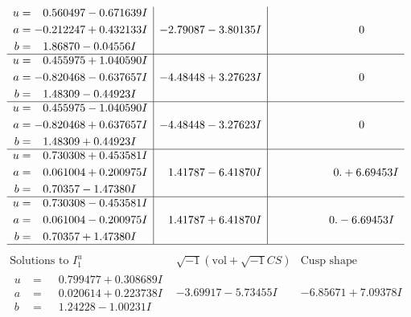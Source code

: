 \documentclass[1p]{elsarticle_modified}
\theoremstyle{definition}
\newcommand{\I}{\sqrt{-1}}
\begin{document}
$$\begin{array}{c|c|c}
\begin{aligned}
u &= \phantom{-}0.560497 - 0.671639 I \\
a &= -0.212247 + 0.432133 I \\
b &= \phantom{-}1.86870 - 0.04556 I\end{aligned}
 & -2.79087 - 3.80135 I & \phantom{-0.000000 } 0 \\ \hline\begin{aligned}
u &= \phantom{-}0.455975 + 1.040590 I \\
a &= -0.820468 - 0.637657 I \\
b &= \phantom{-}1.48309 - 0.44923 I\end{aligned}
 & -4.48448 + 3.27623 I & \phantom{-0.000000 } 0 \\ \hline\begin{aligned}
u &= \phantom{-}0.455975 - 1.040590 I \\
a &= -0.820468 + 0.637657 I \\
b &= \phantom{-}1.48309 + 0.44923 I\end{aligned}
 & -4.48448 - 3.27623 I & \phantom{-0.000000 } 0 \\ \hline\begin{aligned}
u &= \phantom{-}0.730308 + 0.453581 I \\
a &= \phantom{-}0.061004 + 0.200975 I \\
b &= \phantom{-}0.70357 - 1.47380 I\end{aligned}
 & \phantom{-}1.41787 - 6.41870 I & \phantom{-0.000000 -}0. + 6.69453 I \\ \hline\begin{aligned}
u &= \phantom{-}0.730308 - 0.453581 I \\
a &= \phantom{-}0.061004 - 0.200975 I \\
b &= \phantom{-}0.70357 + 1.47380 I\end{aligned}
 & \phantom{-}1.41787 + 6.41870 I & \phantom{-0.000000 } 0. - 6.69453 I\\
 \hline 
 \end{array}$$\newpage$$\begin{array}{c|c|c}  
\text{Solutions to }I^u_{1}& \I (\text{vol} + \sqrt{-1}CS) & \text{Cusp shape}\\
 \hline 
\begin{aligned}
u &= \phantom{-}0.799477 + 0.308689 I \\
a &= \phantom{-}0.020614 + 0.223738 I \\
b &= \phantom{-}1.24228 - 1.00231 I\end{aligned}
 & -3.69917 - 5.73455 I & -6.85671 + 7.09378 I \\ \hline\begin{aligned}

\end{aligned}
\end{array}$$
\end{document}
